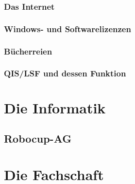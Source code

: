 \documentclass[12pt,a4paper]{scrartcl}
\begin{document}
    \subsubsection{Das Internet}
    
    \subsubsection{Windows- und Softwarelizenzen}
    
    \subsubsection{Bücherreien}
    
	\subsubsection{QIS/LSF und dessen Funktion}
\newpage
\section{Die Informatik}
	\subsection{Robocup-AG}
    

\label{fachschaftsarbeit}
\section{Die Fachschaft}
    

	
	
\end{document}
